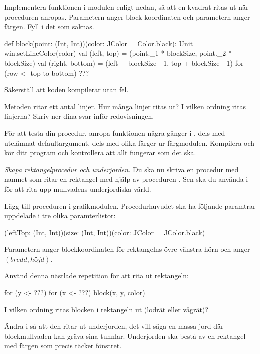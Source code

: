 \noindent Implementera funktionen  i modulen  enligt nedan, så att en kvadrat ritas ut när proceduren anropas. Parametern  anger block-koordinaten och parametern  anger färgen. Fyll i det som saknas.
\begin{Code}
  def block(point: (Int, Int))(color: JColor = Color.black): Unit = {
    win.setLineColor(color)
    val (left, top)     = (point._1 * blockSize, point._2 * blockSize)
    val (right, bottom) = (left + blockSize - 1, top + blockSize - 1)
    for (row <- top to bottom) {
      ???
    }
  }
\end{Code}
Säkerställ att koden kompilerar utan fel.

\Subtask\Pen
Metoden  ritar ett antal linjer.
Hur många linjer ritas ut?
I vilken ordning ritas linjerna?
Skriv ner dina svar inför redovisningen.

\Subtask
För att testa din procedur, anropa funktionen  några gånger i , dels med utelämnat defaultargument, dels med olika färger ur färgmodulen. Kompilera och kör ditt program och kontrollera att allt fungerar som det ska.



\Task \emph{Skapa rektangelprocedur och underjorden.} Du ska nu skriva en procedur med namnet  som ritar en rektangel med hjälp av proceduren . Sen ska du använda  i  för att rita upp mullvadens underjordiska värld.

\Subtask
Lägg till proceduren  i grafikmodulen. Procedurhuvudet ska ha följande paramtrar uppdelade i tre olika paramterlistor:
\begin{Code}
(leftTop: (Int, Int))(size: (Int, Int))(color: JColor = JColor.black)
\end{Code}

Parametern  anger blockkoordinaten för rektangelns övre vänstra hörn och  anger $(bredd, höjd)$.

Använd denna nästlade repetition för att rita ut rektangeln:

\begin{Code}
for (y <- ???) {
	for (x <- ???) {
		block(x, y, color)
	}
}
\end{Code}

\Subtask\Pen
I vilken ordning ritas blocken i rektangeln ut (lodrät eller vågrät)?


\Subtask Ändra i  så att den ritar ut underjorden, det vill säga en massa jord där blockmullvaden kan gräva sina tunnlar.
 Underjorden ska bestå av en rektangel med färgen  som precis täcker fönstret.

